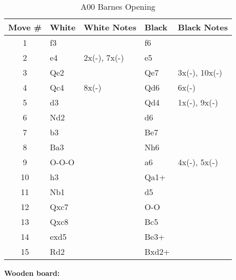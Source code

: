 \begin{table}[htbp]
\centering
\scriptsize
\caption{A00 Barnes Opening}
\begin{tabular}{|c|l|p{5cm}|l|p{5cm}|}
\hline
\textbf{Move \#} & \textbf{White} & \textbf{White Notes} & \textbf{Black} & \textbf{Black Notes} \\
\hline
1  & f3    &                     & f6    &                        \\
2  & e4    & 2x(-), 7x(-)        & e5    &                        \\
3  & Qe2   &                     & Qe7   & 3x(-), 10x(-)           \\
4  & Qc4   & 8x(-)               & Qd6   & 6x(-)                   \\
5  & d3    &                     & Qd4   & 1x(-), 9x(-)            \\
6  & Nd2   &                     & d6    &                        \\
7  & b3    &                     & Be7   &                        \\
8  & Ba3   &                     & Nh6   &                        \\
9  & O-O-O &                     & a6    & 4x(-), 5x(-)            \\
10 & h3    &                     & Qa1+  &                        \\
11 & Nb1   &                     & d5    &                        \\
12 & Qxc7  &                     & O-O   &                        \\
13 & Qxc8  &                     & Bc5   &                        \\
14 & exd5  &                     & Be3+  &                        \\
15 & Rd2   &                     & Bxd2+ &                        \\
\hline
\end{tabular}
\end{table}

\newpage


\begin{center}
\textbf{Wooden board:}
\end{center}

